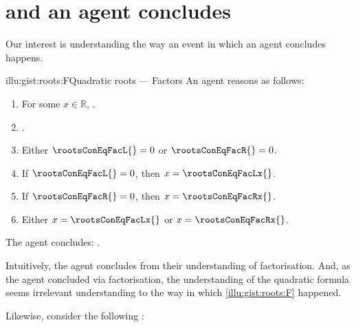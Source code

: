 \chapter{\qWhy{} and \qHow{} an agent concludes}
\label{cha:intro}


\begin{note}
  Our interest is understanding the way an event in which an agent concludes happens.

  \begin{rscenario}{illu:gist:roots:F}{Quadratic roots --- Factors}%
    An agent reasons as follows:
    \begin{enumerate}[label=\arabic*., ref=\arabic*]
    \item
      \label{illu:gist:roots:F:eq}
      For some \(x \in \mathbb{R}\), \rootsConEq{}.
    \item
      \label{illu:gist:roots:F:factor}
      \rootsConEqFac{}.
    \item
      \label{illu:gist:roots:F:zero}
      Either \(\rootsConEqFacL{} = 0\) or \(\rootsConEqFacR{} = 0\).
    \item
      \label{illu:gist:roots:F:case:a}
      If \(\rootsConEqFacL{} = 0\), then \(x = \rootsConEqFacLx{}\).
    \item
      \label{illu:gist:roots:F:case:b}
      If \(\rootsConEqFacR{} = 0\), then \(x = \rootsConEqFacRx{}\).
    \item
      \label{illu:gist:roots:F:factor:done}
      Either \(x = \rootsConEqFacLx{}\) or \(x = \rootsConEqFacRx{}\).
    \end{enumerate}
    The agent concludes:
    \rootsCon{}.
  \end{rscenario}

  \noindent%
  Intuitively, the agent concludes \propI{\rootsCon{}} from their understanding of factorisation.
  And, as the agent concluded via factorisation, the \agents{} understanding of the quadratic formula seems irrelevant understanding to the way in which \autoref{illu:gist:roots:F} happened.

  Likewise, consider the following :


\end{note}
